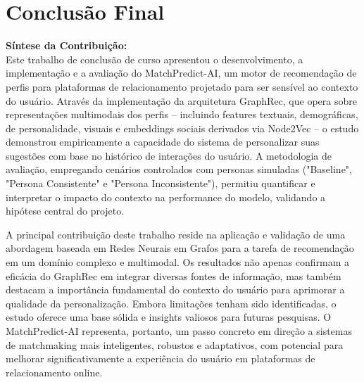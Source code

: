 \section{Conclusão Final}
\label{sec:discussao_conclusao_final}

\textbf{Síntese da Contribuição:} \\
Este trabalho de conclusão de curso apresentou o desenvolvimento, a implementação e a avaliação do MatchPredict-AI, um motor de recomendação de perfis para plataformas de relacionamento projetado para ser sensível ao contexto do usuário. Através da implementação da arquitetura GraphRec, que opera sobre representações multimodais dos perfis – incluindo features textuais, demográficas, de personalidade, visuais e embeddings sociais derivados via Node2Vec – o estudo demonstrou empiricamente a capacidade do sistema de personalizar suas sugestões com base no histórico de interações do usuário. A metodologia de avaliação, empregando cenários controlados com personas simuladas ("Baseline", "Persona Consistente" e "Persona Inconsistente"), permitiu quantificar e interpretar o impacto do contexto na performance do modelo, validando a hipótese central do projeto.

A principal contribuição deste trabalho reside na aplicação e validação de uma abordagem baseada em Redes Neurais em Grafos para a tarefa de recomendação em um domínio complexo e multimodal. Os resultados não apenas confirmam a eficácia do GraphRec em integrar diversas fontes de informação, mas também destacam a importância fundamental do contexto do usuário para aprimorar a qualidade da personalização. Embora limitações tenham sido identificadas, o estudo oferece uma base sólida e insights valiosos para futuras pesquisas. O MatchPredict-AI representa, portanto, um passo concreto em direção a sistemas de matchmaking mais inteligentes, robustos e adaptativos, com potencial para melhorar significativamente a experiência do usuário em plataformas de relacionamento online.